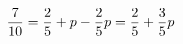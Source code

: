 \documentclass[preview]{standalone}
\begin{document}
\begin{align*}
\special{dvisvgm:raw <g id='unique000'>}\frac7{10}=\frac25+p-\frac25p=\frac25+\frac35p\special{dvisvgm:raw </g>}
\end{align*}
\end{document}
